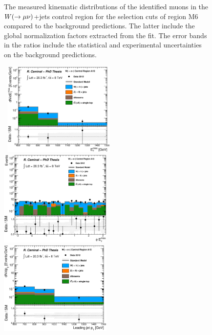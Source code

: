 \begin{figure}[!ht]
\begin{center}
{    }
  \end{center}
  \caption[Kinematic distributions of the identified muons in the $\wmn$+jets control region for the selection cuts of region M6, after the normalization factors extracted from the fit have been applied.]{The measured kinematic distributions of the identified muons in the $\wmn$+jets control region for the selection cuts of region M6 compared to the background predictions. The latter include the global normalization factors extracted from the fit. The error bands in the ratios include the statistical and experimental uncertainties on the background predictions.}
  \label{fig:Plot_M6_CRwmn_Leptonkinematics}
\end{figure}


\begin{figure}[!ht]
  \begin{center}
    \mbox{
      \includegraphics[width=0.495\textwidth]{Appendix_FluctuationM6/Figures/plot_Stop_A10_CRele_met_fitted.eps}
      \includegraphics[width=0.495\textwidth]{Appendix_FluctuationM6/Figures/plot_Stop_A10_CRele_met_phi_fitted.eps}
    }
    \mbox{
      \includegraphics[width=0.495\textwidth]{Appendix_FluctuationM6/Figures/plot_Stop_A10_CRele_pt1_fitted.eps}
}
\end{center}
\end{figure}

